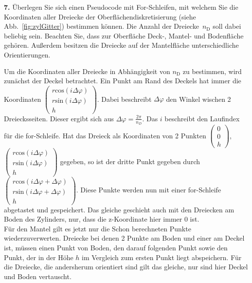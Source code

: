 \documentclass[Protokollheft.tex]{subfiles}
\begin{document}
	
	
	\begin{framed}
		\noindent \textbf{7.} Überlegen Sie sich einen Pseudocode mit For-Schleifen, mit welchem Sie die Koordinaten aller Dreiecke der Oberflächendiskretisierung (siehe Abb.~\ref{fig:zylGitter}) bestimmen können. Die Anzahl der Dreiecke~$n_\text{D}$ soll dabei beliebig sein. Beachten Sie, dass zur Oberfläche Deck-, Mantel- und Bodenfläche gehören. Außerdem besitzen die Dreiecke auf der Mantelfläche \glqq unterschiedliche Orientierungen\grqq.\label{exer:pseudocodeCylinder}
	\end{framed}
	\noindent
	Um die Koordinaten aller Dreiecke in Abhängigkeit von $n_\text{D}$ zu bestimmen, wird zunächst der Deckel betrachtet. Ein Punkt am Rand des Deckels hat immer die Koordinaten 
$	\begin{pmatrix}
		r\text{cos}(i\Delta\varphi)\\
		r\text{sin}(i\Delta\varphi)\\
		h
	\end{pmatrix}$.
	Dabei beschreibt $\Delta\varphi$ den Winkel wischen 2 Dreiecksseiten. Dieser ergibt sich aus $\Delta\varphi=\frac{2\pi}{n_D}$. Das $i$ beschreibt den Laufindex für die for-Schleife. Hat das Dreieck als Koordinaten von 2 Punkten 
	$\begin{pmatrix}
		0\\
		0\\
		h
	\end{pmatrix}$,
	$\begin{pmatrix}
		r\text{cos}(i\Delta\varphi)\\
		r\text{sin}(i\Delta\varphi)\\
		h
	\end{pmatrix}$ gegeben, so ist der dritte Punkt gegeben durch
$	\begin{pmatrix}
		r\text{cos}(i\Delta\varphi+\Delta\varphi)\\
		r\text{sin}(i\Delta\varphi+\Delta\varphi)\\
		h
	\end{pmatrix}$.
	Diese Punkte werden nun mit einer for-Schleife abgetastet und gespeichert. Das gleiche geschieht auch mit den Dreiecken am Boden des Zylinders, nur, dass die z-Koordinate hier immer 0 ist.\\
	Für den Mantel gilt es jetzt nur die Schon berechneten Punkte wiederzuverwerten. Dreiecke bei denen 2 Punkte am Boden und einer am Deckel ist, müssen einen Punkt von Boden, den darauf folgenden Punkt sowie den Punkt, der in der Höhe $h$ im Vergleich zum ersten Punkt liegt abspeichern. Für die Dreiecke, die andersherum orientiert sind gilt das gleiche, nur sind hier Deckel und Boden vertauscht. 
	
\end{document}
